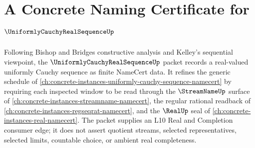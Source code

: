 \chapter{A Concrete Naming Certificate for $\UniformlyCauchyRealSequenceUp$}
\label{ch:concrete-instances-uniformly-cauchy-real-sequence-namecert}

Following Bishop and Bridges constructive analysis and Kelley's sequential viewpoint, the $\UniformlyCauchyRealSequenceUp$ packet records a real-valued uniformly Cauchy sequence as finite NameCert data. It refines the generic schedule of \autoref{ch:concrete-instances-uniformly-cauchy-sequence-namecert} by requiring each inspected window to be read through the $\StreamNameUp$ surface of \autoref{ch:concrete-instances-streamname-namecert}, the regular rational readback of \autoref{ch:concrete-instances-regseqrat-namecert}, and the $\RealUp$ seal of \autoref{ch:concrete-instances-real-namecert}. The packet supplies an L10 Real and Completion consumer edge; it does not assert quotient streams, selected representatives, selected limits, countable choice, or ambient real completeness.

